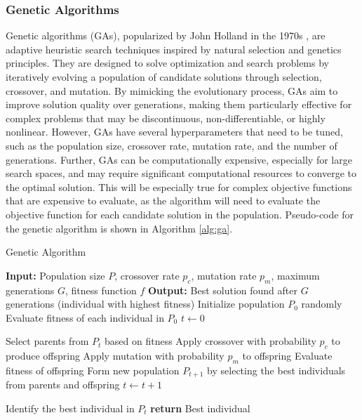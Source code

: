 \documentclass{article}[12pt]
\begin{document}
\subsubsection*{Genetic Algorithms}
Genetic algorithms (GAs), popularized by John Holland in the 1970s \cite{Holland:1975aa}, are adaptive heuristic search techniques inspired by natural selection and genetics principles. 
They are designed to solve optimization and search problems by iteratively evolving a population of candidate solutions through selection, crossover, and mutation. 
By mimicking the evolutionary process, GAs aim to improve solution quality over generations, making them particularly effective for complex problems that may be discontinuous, non-differentiable, or highly nonlinear.
However, GAs have several hyperparameters that need to be tuned, such as the population size, crossover rate, mutation rate, and the number of generations.
Further, GAs can be computationally expensive, especially for large search spaces, and may require significant computational resources to converge to the optimal solution.
This will be especially true for complex objective functions that are expensive to evaluate, as the algorithm will need to evaluate the objective function for each candidate solution in the population.
Pseudo-code for the genetic algorithm is shown in Algorithm \ref{alg:ga}.

\begin{algorithm}[H]
\caption{Genetic Algorithm}\label{alg:ga}
\begin{algorithmic}[1]
\State \textbf{Input:} Population size $P$, crossover rate $p_c$, mutation rate $p_m$, maximum generations $G$, fitness function $f$
\State \textbf{Output:} Best solution found after $G$ generations (individual with highest fitness)
\State Initialize population $P_0$ randomly
\State Evaluate fitness of each individual in $P_0$
\State $t \gets 0$

    \State Select parents from $P_t$ based on fitness
    \State Apply crossover with probability $p_c$ to produce offspring
    \State Apply mutation with probability $p_m$ to offspring
    \State Evaluate fitness of offspring
    \State Form new population $P_{t+1}$ by selecting the best individuals from parents and offspring
    \State $t \gets t + 1$
\EndWhile

\State Identify the best individual in $P_t$
\State \textbf{return} Best individual
\end{algorithmic}
\end{algorithm}
\end{document}
